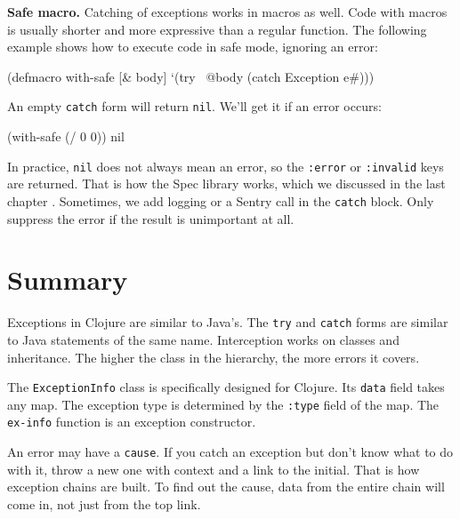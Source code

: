 \fi

\textbf{Safe macro.} Catching of exceptions works in macros as well. Code with macros is usually shorter and more expressive than a regular function. The following example shows how to execute code in safe mode, ignoring an error:


\begin{english}
  \begin{clojure}
(defmacro with-safe [& body]
  `(try
     ~@body
     (catch Exception e#)))
  \end{clojure}
\end{english}

\noindent
An empty \verb|catch| form will return \verb|nil|. We'll get it if an error occurs:

\begin{english}
  \begin{clojure}
(with-safe (/ 0 0))
nil
  \end{clojure}
\end{english}

In practice, \verb|nil| does not always mean an error, so the \verb|:error| or \verb|:invalid| keys are returned. That is how the Spec library works, which we discussed in the last chapter . Sometimes, we add logging or a Sentry call in the \verb|catch| block. Only suppress the error if the result is unimportant at all.

\section{Summary}

Exceptions in Clojure are similar to Java's. The \verb|try| and \verb|catch| forms are similar to Java statements of the same name. Interception works on classes and inheritance. The higher the class in the hierarchy, the more errors it covers.

The \verb|ExceptionInfo| class is specifically designed for Clojure. Its \verb|data| field takes any map. The exception type is determined by the \verb|:type| field of the map. The \verb|ex-info| function is an exception constructor.

An error may have a \verb|cause|. If you catch an exception but don't know what to do with it, throw a new one with context and a link to the initial. That is how exception chains are built. To find out the cause, data from the entire chain will come in, not just from the top link.

